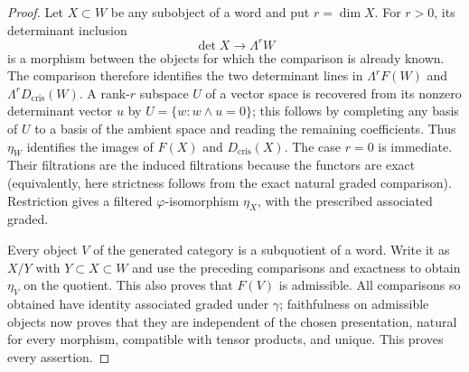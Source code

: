\begin{proof}
Let $X\subset W$ be any subobject of a word and put $r=\dim X$.
For $r>0$, its determinant inclusion
\[
 \det X\longrightarrow\Lambda^r W
\]
is a morphism between the objects for which the comparison is already
known.  The comparison therefore identifies the two determinant lines
in $\Lambda^rF(W)$ and $\Lambda^rD_{\mathrm{cris}}(W)$.
A rank-$r$ subspace $U$ of a vector space is recovered from its
nonzero determinant vector $u$ by
$U=\{w:w\wedge u=0\}$; this follows by completing any basis of $U$
to a basis of the ambient space and reading the remaining coefficients.
Thus $\eta_W$ identifies the images of $F(X)$ and
$D_{\mathrm{cris}}(X)$.  The case $r=0$ is immediate.
Their filtrations are the induced filtrations because the functors
are exact (equivalently, here strictness follows from the exact natural
graded comparison).  Restriction gives a filtered $\varphi$-isomorphism
$\eta_X$, with the prescribed associated graded.

Every object $V$ of the generated category is a subquotient of a word.
Write it as $X/Y$ with $Y\subset X\subset W$ and use the preceding
comparisons and exactness to obtain $\eta_V$ on the quotient.
This also proves that $F(V)$ is admissible.  All comparisons so obtained
have identity associated graded under $\gamma$; faithfulness on
admissible objects now proves that they are independent of the chosen
presentation, natural for every morphism, compatible with tensor
products, and unique.  This proves every assertion.
\end{proof}

